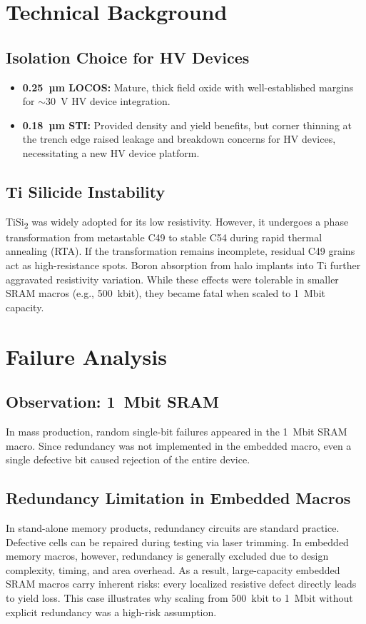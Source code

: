 \documentclass[conference]{IEEEtran}
\begin{document}
\section{Technical Background}
\subsection{Isolation Choice for HV Devices}
\begin{itemize}
    \item \textbf{0.25~µm LOCOS:} Mature, thick field oxide with well-established margins for $\sim$30~V HV device integration.
    \item \textbf{0.18~µm STI:} Provided density and yield benefits, but corner thinning at the trench edge raised leakage and breakdown concerns for HV devices, necessitating a new HV device platform.
\end{itemize}

\subsection{Ti Silicide Instability}
TiSi\textsubscript{2} was widely adopted for its low resistivity. However, it undergoes a phase transformation from metastable C49 to stable C54 during rapid thermal annealing (RTA).  
If the transformation remains incomplete, residual C49 grains act as high-resistance spots.  
Boron absorption from halo implants into Ti further aggravated resistivity variation.  
While these effects were tolerable in smaller SRAM macros (e.g., 500~kbit), they became fatal when scaled to 1~Mbit capacity.

\section{Failure Analysis}
\subsection{Observation: 1~Mbit SRAM}
In mass production, random single-bit failures appeared in the 1~Mbit SRAM macro. Since redundancy was not implemented in the embedded macro, even a single defective bit caused rejection of the entire device.

\subsection{Redundancy Limitation in Embedded Macros}
In stand-alone memory products, redundancy circuits are standard practice. Defective cells can be repaired during testing via laser trimming.  
In embedded memory macros, however, redundancy is generally excluded due to design complexity, timing, and area overhead.  
As a result, large-capacity embedded SRAM macros carry inherent risks: every localized resistive defect directly leads to yield loss.  
This case illustrates why scaling from 500~kbit to 1~Mbit without explicit redundancy was a high-risk assumption.
\end{document}
